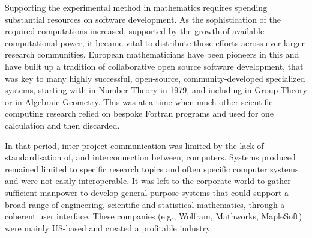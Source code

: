 Supporting the experimental method in mathematics requires spending
substantial resources
on software development. As the sophistication of the required
computations increased, supported by the growth of available
computational power, it became vital to distribute those efforts across
ever-larger research communities. European mathematicians have been
pioneers in this and have built up a tradition of collaborative open
source software development, that was key
to many highly successful,
open-source, community-developed specialized systems, starting with
\PariGP in Number Theory in 1979, and including \GAP in Group Theory
or \Singular in Algebraic Geometry. This was at a time when much other
scientific computing research relied on bespoke Fortran programs and used
for one calculation and then discarded.
%



In that period, inter-project communication was limited by the lack of
standardisation of, and interconnection between, computers. Systems
produced remained limited
to specific research topics and often specific computer systems and
were not easily interoperable. It was left to the
corporate world to gather sufficient manpower to develop general
purpose systems that could support a broad range of engineering,
scientific and statistical mathematics, through a coherent user
interface. These companies (e.g., Wolfram, Mathworks, MapleSoft) were
mainly US-based and created a profitable industry.


